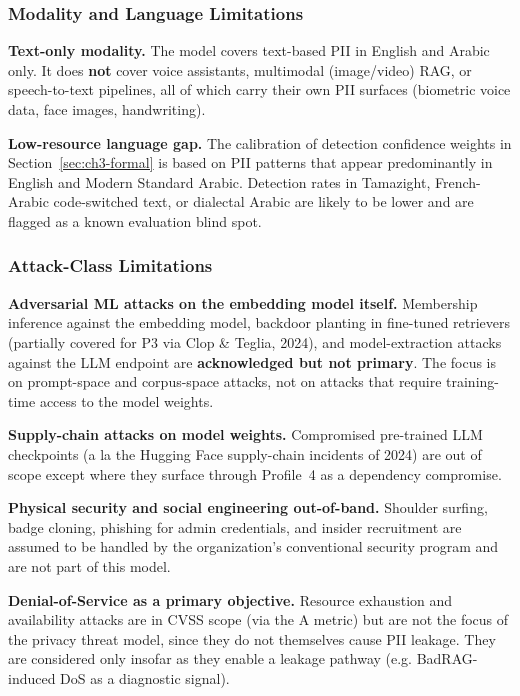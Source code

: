 \documentclass[11pt,a4paper]{report}
\begin{document}
\subsubsection{Modality and Language Limitations}

\begin{limitbox}
\textbf{Text-only modality.} The model covers text-based PII in English
and Arabic only. It does \textbf{not} cover voice assistants, multimodal
(image/video) RAG, or speech-to-text pipelines, all of which carry their
own PII surfaces (biometric voice data, face images, handwriting).

\textbf{Low-resource language gap.} The calibration of detection
confidence weights in Section~\ref{sec:ch3-formal} is based on PII patterns that appear
predominantly in English and Modern Standard Arabic. Detection rates in
Tamazight, French-Arabic code-switched text, or dialectal Arabic are
likely to be lower and are flagged as a known evaluation blind spot.
\end{limitbox}

\subsubsection{Attack-Class Limitations}

\begin{limitbox}
\textbf{Adversarial ML attacks on the embedding model itself.}
Membership inference against the embedding model, backdoor planting in
fine-tuned retrievers (partially covered for P3 via Clop \& Teglia, 2024),
and model-extraction attacks against the LLM endpoint are
\textbf{acknowledged but not primary}. The focus is on prompt-space and
corpus-space attacks, not on attacks that require training-time access to
the model weights.

\textbf{Supply-chain attacks on model weights.} Compromised pre-trained
LLM checkpoints (a la the Hugging Face supply-chain incidents of 2024)
are out of scope except where they surface through Profile~4 as a
dependency compromise.

\textbf{Physical security and social engineering out-of-band.} Shoulder
surfing, badge cloning, phishing for admin credentials, and insider
recruitment are assumed to be handled by the organization's conventional
security program and are not part of this model.

\textbf{Denial-of-Service as a primary objective.} Resource exhaustion
and availability attacks are in CVSS scope (via the A metric) but are
not the focus of the privacy threat model, since they do not themselves
cause PII leakage. They are considered only insofar as they enable
a leakage pathway (e.g. BadRAG-induced DoS as a diagnostic signal).
\end{limitbox}
\end{document}
